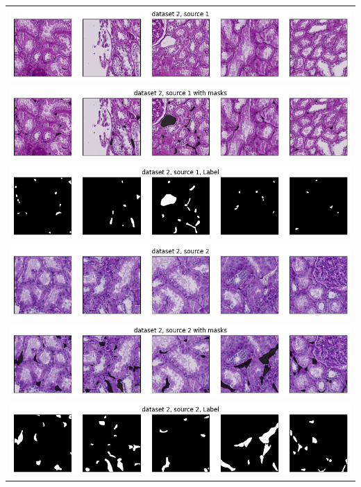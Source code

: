 \begin{longtable}{c}
	\includegraphics[width=\textwidth]{gambar/bab4/ds2s1_0.png} \\
	\includegraphics[width=\textwidth]{gambar/bab4/ds2s1_1.png} \\
	\includegraphics[width=\textwidth]{gambar/bab4/ds2s1_2.png} \\
	
	
	\includegraphics[width=\textwidth]{gambar/bab4/ds2s2_0.png} \\
	\includegraphics[width=\textwidth]{gambar/bab4/ds2s2_1.png} \\
	\includegraphics[width=\textwidth]{gambar/bab4/ds2s2_2.png} \\
	

\end{longtable}
